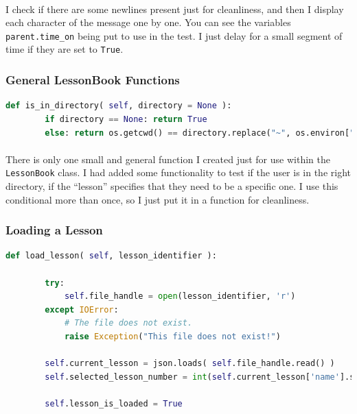 \documentclass[11pt]{article}
\begin{document}
	\paragraph{} I check if there are some newlines present just for cleanliness, and then I display each character of the message one by one. You can see the variables \texttt{parent.time\_on} being put to use in the test. I just delay for a small segment of time if they are set to \texttt{True}. 

	\subsubsection{General LessonBook Functions}

	\begin{lstlisting}[language=Python]
	def is_in_directory( self, directory = None ):
		if directory == None: return True
		else: return os.getcwd() == directory.replace("~", os.environ["HOME"])
\end{lstlisting}

	\paragraph{}

	\paragraph{} There is only one small and general function I created just for use within the \texttt{LessonBook} class. I had added some functionality to test if the user is in the right directory, if the ``lesson'' specifies that they need to be a specific one. I use this conditional more than once, so I just put it in a function for cleanliness.

	\subsubsection{Loading a Lesson}

\begin{lstlisting}[language=Python]
	def load_lesson( self, lesson_identifier ):

		try:
			self.file_handle = open(lesson_identifier, 'r')
		except IOError:
			# The file does not exist.
			raise Exception("This file does not exist!")
		
		self.current_lesson = json.loads( self.file_handle.read() )
		self.selected_lesson_number = int(self.current_lesson['name'].split(".")[0]) - 1
		
		self.lesson_is_loaded = True
\end{lstlisting}
	
\end{document}
